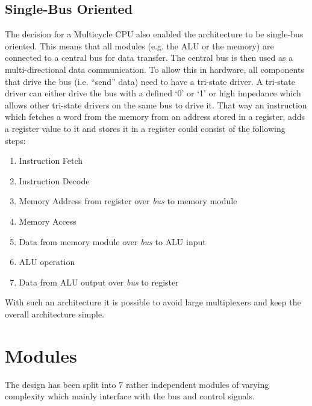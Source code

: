 \subsection{Single-Bus Oriented}
The decision for a Multicycle \gls{CPU} also enabled the architecture to be single-bus oriented.
This means that all modules (e.g. the \gls{ALU} or the memory) are connected to a central bus for data transfer.
The central bus is then used as a multi-directional data communication.
To allow this in hardware, all components that drive the bus (i.e. ``send'' data) need to have a tri-state driver.
A tri-state driver can either drive the bus with a defined `0' or `1' or high impedance which allows other tri-state drivers on the same bus to drive it.
That way an instruction which fetches a word from the memory from an address stored in a register, adds a register value to it and stores it in a register could consist of the following steps:
\begin{enumerate}
  \item Instruction Fetch
  \item Instruction Decode
  \item Memory Address from register over \emph{bus} to memory module
  \item Memory Access
  \item Data from memory module over \emph{bus} to \gls{ALU} input
  \item \gls{ALU} operation
  \item Data from \gls{ALU} output over \emph{bus} to register
\end{enumerate}
With such an architecture it is possible to avoid large multiplexers and keep the overall architecture simple.


\section{Modules}
The design has been split into 7 rather independent modules of varying complexity which mainly interface with the bus and control signals.
